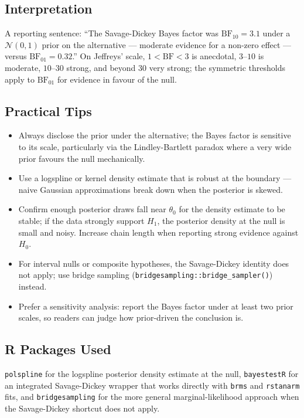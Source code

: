 \documentclass[
]{article}
\providecommand{\tightlist}{%
  \setlength{\itemsep}{0pt}\setlength{\parskip}{0pt}}
\begin{document}
\subsection{Interpretation}\label{interpretation}

A reporting sentence: ``The Savage-Dickey Bayes factor was
\(\mathrm{BF}_{10} = 3.1\) under a \(\mathcal N(0, 1)\) prior on the
alternative --- moderate evidence for a non-zero effect --- versus
\(\mathrm{BF}_{01} = 0.32\).'' On Jeffreys' scale,
\(1 < \mathrm{BF} < 3\) is anecdotal, \(3\)--\(10\) is moderate,
\(10\)--\(30\) strong, and beyond \(30\) very strong; the symmetric
thresholds apply to \(\mathrm{BF}_{01}\) for evidence in favour of the
null.

\subsection{Practical Tips}\label{practical-tips}

\begin{itemize}
\tightlist
\item
  Always disclose the prior under the alternative; the Bayes factor is
  sensitive to its scale, particularly via the Lindley-Bartlett paradox
  where a very wide prior favours the null mechanically.
\item
  Use a logspline or kernel density estimate that is robust at the
  boundary --- naive Gaussian approximations break down when the
  posterior is skewed.
\item
  Confirm enough posterior draws fall near \(\theta_0\) for the density
  estimate to be stable; if the data strongly support \(H_1\), the
  posterior density at the null is small and noisy. Increase chain
  length when reporting strong evidence against \(H_0\).
\item
  For interval nulls or composite hypotheses, the Savage-Dickey identity
  does not apply; use bridge sampling
  (\texttt{bridgesampling::bridge\_sampler()}) instead.
\item
  Prefer a sensitivity analysis: report the Bayes factor under at least
  two prior scales, so readers can judge how prior-driven the conclusion
  is.
\end{itemize}

\subsection{R Packages Used}\label{r-packages-used}

\texttt{polspline} for the logspline posterior density estimate at the
null, \texttt{bayestestR} for an integrated Savage-Dickey wrapper that
works directly with \texttt{brms} and \texttt{rstanarm} fits, and
\texttt{bridgesampling} for the more general marginal-likelihood
approach when the Savage-Dickey shortcut does not apply.
\end{document}
